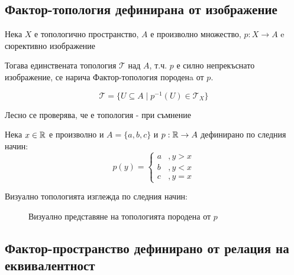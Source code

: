 \subsection{Фактор-топология дефинирана от изображение}
\begin{definition}
    Нека $X$ е топологично пространство, $A$ е произволно множество, $p: X \to A$ e сюрективно изображение

    Тогава единствената топология $\mathcal T$ над $A$, т.ч. $p$ е силно непрекъснато изображение, се нарича Фактор-топология породенa от $p$.

    \begin{equation}
        \mathcal T = \{U \subseteq A \mid p^{-1}(U) \in \mathcal T_X\}
    \end{equation}
\end{definition}
Лесно се проверява, че е топология - при съмнение \cite[стр.~138]{munkrestopology}

\begin{example}
    Нека $x \in {\mathbb{R}}$ е произволно и $A = \{a, b, c\}$ и $p: {\mathbb{R}} \to A$ дефинирано по следния начин:
    \begin{equation}
        p(y) = \begin{cases}
            a &, y > x\\
            b &, y < x\\
            c &, y = x
        \end{cases}
    \end{equation}

    Визуално топологията изглежда по следния начин:
    \begin{figure}[H]
        \centering
        \caption{Визуално представяне на топологията породена от $p$}
    \end{figure}
\end{example}

\subsection{Фактор-пространство дефинирано от релация на еквивалентност}
